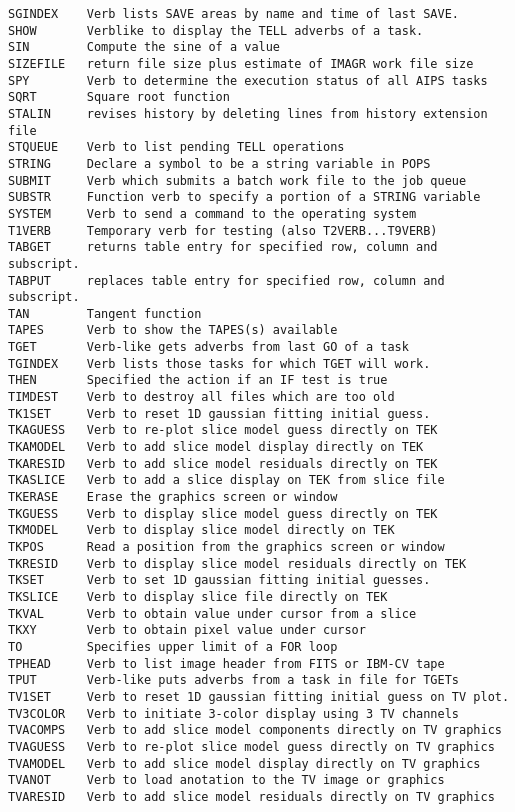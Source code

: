 \begin{verbatim}
SGINDEX    Verb lists SAVE areas by name and time of last SAVE.
SHOW       Verblike to display the TELL adverbs of a task.
SIN        Compute the sine of a value
SIZEFILE   return file size plus estimate of IMAGR work file size
SPY        Verb to determine the execution status of all AIPS tasks
SQRT       Square root function
STALIN     revises history by deleting lines from history extension file
STQUEUE    Verb to list pending TELL operations
STRING     Declare a symbol to be a string variable in POPS
SUBMIT     Verb which submits a batch work file to the job queue
SUBSTR     Function verb to specify a portion of a STRING variable
SYSTEM     Verb to send a command to the operating system
T1VERB     Temporary verb for testing (also T2VERB...T9VERB)
TABGET     returns table entry for specified row, column and subscript.
TABPUT     replaces table entry for specified row, column and subscript.
TAN        Tangent function
TAPES      Verb to show the TAPES(s) available
TGET       Verb-like gets adverbs from last GO of a task
TGINDEX    Verb lists those tasks for which TGET will work.
THEN       Specified the action if an IF test is true
TIMDEST    Verb to destroy all files which are too old
TK1SET     Verb to reset 1D gaussian fitting initial guess.
TKAGUESS   Verb to re-plot slice model guess directly on TEK
TKAMODEL   Verb to add slice model display directly on TEK
TKARESID   Verb to add slice model residuals directly on TEK
TKASLICE   Verb to add a slice display on TEK from slice file
TKERASE    Erase the graphics screen or window
TKGUESS    Verb to display slice model guess directly on TEK
TKMODEL    Verb to display slice model directly on TEK
TKPOS      Read a position from the graphics screen or window
TKRESID    Verb to display slice model residuals directly on TEK
TKSET      Verb to set 1D gaussian fitting initial guesses.
TKSLICE    Verb to display slice file directly on TEK
TKVAL      Verb to obtain value under cursor from a slice
TKXY       Verb to obtain pixel value under cursor
TO         Specifies upper limit of a FOR loop
TPHEAD     Verb to list image header from FITS or IBM-CV tape
TPUT       Verb-like puts adverbs from a task in file for TGETs
TV1SET     Verb to reset 1D gaussian fitting initial guess on TV plot.
TV3COLOR   Verb to initiate 3-color display using 3 TV channels
TVACOMPS   Verb to add slice model components directly on TV graphics
TVAGUESS   Verb to re-plot slice model guess directly on TV graphics
TVAMODEL   Verb to add slice model display directly on TV graphics
TVANOT     Verb to load anotation to the TV image or graphics
TVARESID   Verb to add slice model residuals directly on TV graphics

\end{verbatim}
